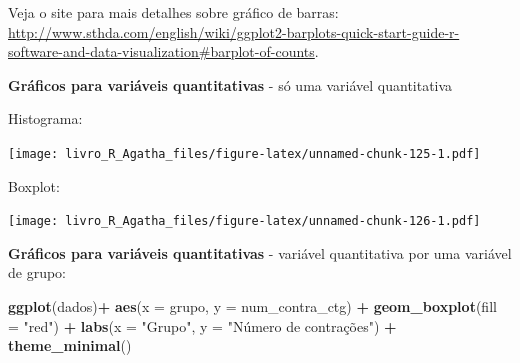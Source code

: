 \documentclass[
]{book}
\newenvironment{Shaded}{\begin{snugshade}}{\end{snugshade}}
\newcommand{\DataTypeTok}[1]{\textcolor[rgb]{0.13,0.29,0.53}{#1}}
\newcommand{\KeywordTok}[1]{\textcolor[rgb]{0.13,0.29,0.53}{\textbf{#1}}}
\newcommand{\NormalTok}[1]{#1}
\newcommand{\OperatorTok}[1]{\textcolor[rgb]{0.81,0.36,0.00}{\textbf{#1}}}
\newcommand{\StringTok}[1]{\textcolor[rgb]{0.31,0.60,0.02}{#1}}
\begin{document}
Veja o site para mais detalhes sobre gráfico de barras:
\url{http://www.sthda.com/english/wiki/ggplot2-barplots-quick-start-guide-r-software-and-data-visualization\#barplot-of-counts}.

\textbf{Gráficos para variáveis quantitativas} - só uma variável quantitativa

Histograma:

\begin{Shaded}
\end{Shaded}

\texttt{[image: livro\_R\_Agatha\_files/figure-latex/unnamed-chunk-125-1.pdf]}

Boxplot:

\begin{Shaded}
\end{Shaded}

\texttt{[image: livro\_R\_Agatha\_files/figure-latex/unnamed-chunk-126-1.pdf]}

\textbf{Gráficos para variáveis quantitativas} - variável quantitativa por uma variável de grupo:

\begin{Shaded}
\begin{Highlighting}[]
\KeywordTok{ggplot}\NormalTok{(dados)}\OperatorTok{+}
\StringTok{  }\KeywordTok{aes}\NormalTok{(}\DataTypeTok{x =}\NormalTok{ grupo, }\DataTypeTok{y =}\NormalTok{ num_contra_ctg) }\OperatorTok{+}
\StringTok{  }\KeywordTok{geom_boxplot}\NormalTok{(}\DataTypeTok{fill =} \StringTok{"red"}\NormalTok{) }\OperatorTok{+}
\StringTok{  }\KeywordTok{labs}\NormalTok{(}\DataTypeTok{x =} \StringTok{"Grupo"}\NormalTok{, }\DataTypeTok{y =} \StringTok{"Número de contrações"}\NormalTok{) }\OperatorTok{+}
\StringTok{  }\KeywordTok{theme_minimal}\NormalTok{()}
\end{Highlighting}
\end{Shaded}
\end{document}
